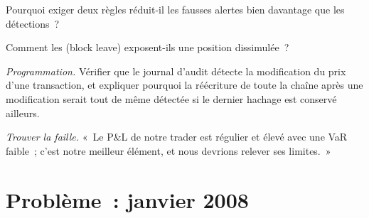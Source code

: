 \begin{exercise}[$\star\star$]\label{exo:rc:operational-risk-and-rogue-trading:5}
Pourquoi exiger deux règles réduit-il les fausses alertes bien davantage que les détections~?
\end{exercise}

\begin{exercise}[$\star\star$]\label{exo:rc:operational-risk-and-rogue-trading:6}
Comment les  (block leave) exposent-ils une position dissimulée~?
\end{exercise}

\begin{exercise}[$\star\star\star$]\label{exo:rc:operational-risk-and-rogue-trading:7}
\emph{Programmation.} Vérifier que le journal d'audit détecte la modification du prix d'une transaction, et expliquer pourquoi
la réécriture de toute la chaîne après une modification serait tout de même détectée si le dernier hachage est conservé ailleurs.
\end{exercise}

\begin{exercise}[$\star\star\star$]\label{exo:rc:operational-risk-and-rogue-trading:8}
\emph{Trouver la faille.} «~Le P\&L de notre trader est régulier et élevé avec une VaR faible~; c'est notre meilleur élément, et
nous devrions relever ses limites.~»
\end{exercise}

\section{Problème~: janvier 2008}

